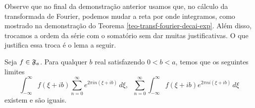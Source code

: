         Observe que no final da demonstração anterior usamos que, no cálculo da 
        transformada de Fourier, podemos mudar a reta por onde integramos, como mostrado 
        na demonstração do Teorema \ref{teo-transf-fourier-decai-exp}. Além disso, trocamos
        a ordem da série com o somatório sem dar muitas justificativas. 
        O que justifica essa troca é o lema a seguir.
        \begin{lema}
            Seja $f \in \mathfrak{F}_a$. Para qualquer $b$ real satisfazendo $0 < b < a$, 
            temos que os seguintes limites
            \begin{equation*}
            \int_{-\infty}^{\infty}f(\xi + ib)\sum_{n=0}^{\infty}e^{2\pi i n(\xi + ib)}\,d\xi, 
            \hspace{7pt}
            \sum_{n=0}^{\infty} \int_{-\infty}^{\infty}f(\xi + ib)e^{2\pi ni(\xi + ib)}\,d\xi
            \end{equation*}
            existem e são iguais.
        \end{lema}
